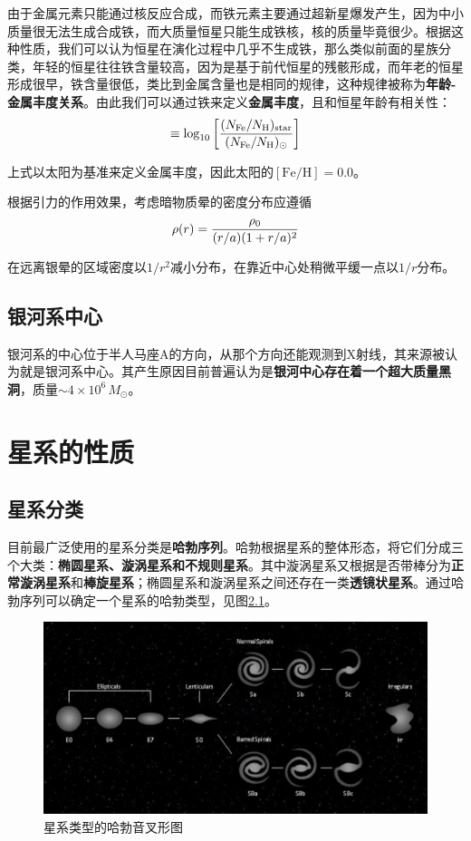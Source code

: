 \documentclass[openany]{ctexbook}
\begin{document}
由于金属元素只能通过核反应合成，而铁元素主要通过超新星爆发产生，因为中小质量很无法生成合成铁，而大质量恒星只能生成铁核，核的质量毕竟很少。根据这种性质，我们可以认为恒星在演化过程中几乎不生成铁，那么类似前面的星族分类，年轻的恒星往往铁含量较高，因为是基于前代恒星的残骸形成，而年老的恒星形成很早，铁含量很低，类比到金属含量也是相同的规律，这种规律被称为\textbf{年龄-金属丰度关系}。由此我们可以通过铁来定义\textbf{金属丰度}，且和恒星年龄有相关性：
\begin{equation}
  [\mathrm{Fe/H}]\equiv \log_{10}\left[{(N_\mathrm{Fe}/N_\mathrm{H})_\mathrm{star}\over (N_\mathrm{Fe}/N_\mathrm{H})_\odot}\right]
\end{equation}

上式以太阳为基准来定义金属丰度，因此太阳的$[\mathrm{Fe/H}]=0.0$。

根据引力的作用效果，考虑暗物质晕的密度分布应遵循
\begin{equation}
  \rho(r)={\rho_0 \over (r/a)(1+r/a)^2}
\end{equation}

在远离银晕的区域密度以$1/r^2$减小分布，在靠近中心处稍微平缓一点以$1/r$分布。

\section{银河系中心}
银河系的中心位于半人马座A的方向，从那个方向还能观测到X射线，其来源被认为就是银河系中心。其产生原因目前普遍认为是\textbf{银河中心存在着一个超大质量黑洞}，质量$\sim 4\times 10^6\,M_\odot$。

\chapter{星系的性质}
\section{星系分类}
目前最广泛使用的星系分类是\textbf{哈勃序列}。哈勃根据星系的整体形态，将它们分成三个大类：\textbf{椭圆星系、漩涡星系和不规则星系}。其中漩涡星系又根据是否带棒分为\textbf{正常漩涡星系}和\textbf{棒旋星系}；椭圆星系和漩涡星系之间还存在一类\textbf{透镜状星系}。通过哈勃序列可以确定一个星系的哈勃类型，见图\ref{fig:hubblesequence}。

\begin{figure}[hbt]
  \centering
  \includegraphics[width=12cm]{chapters/25/fork}
  \caption{星系类型的哈勃音叉形图}
  \label{fig:hubblesequence}
\end{figure}
\end{document}
